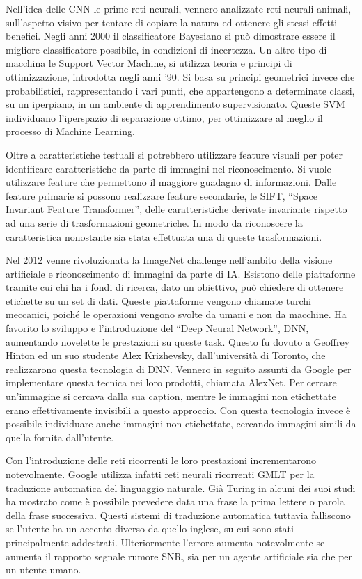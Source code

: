 \documentclass{article}
\numberwithin{equation}{subsection}
\begin{document}
Nell'idea delle CNN le prime reti neurali, vennero analizzate reti neurali animali, sull'aspetto visivo per tentare di copiare la natura ed ottenere gli stessi effetti 
benefici. 
Negli anni 2000 il classificatore Bayesiano si può dimostrare essere il migliore classificatore possibile, in condizioni di incertezza. Un altro tipo di macchina 
le Support Vector Machine, si utilizza teoria e principi di ottimizzazione, introdotta negli anni '90. Si basa su principi geometrici invece che probabilistici, 
rappresentando i vari punti, che appartengono a determinate classi,  su un iperpiano, in un ambiente di apprendimento supervisionato. Queste SVM individuano l'iperspazio 
di separazione ottimo, per ottimizzare al meglio il processo di Machine Learning. 

Oltre a caratteristiche testuali si potrebbero utilizzare feature visuali per poter identificare caratteristiche da parte di immagini nel riconoscimento. Si vuole 
utilizzare feature che permettono il maggiore guadagno di informazioni. Dalle feature primarie si possono realizzare feature secondarie, le SIFT, ``Space Invariant Feature Transformer'', 
delle caratteristiche derivate invariante rispetto ad una serie di trasformazioni geometriche. In modo da riconoscere la caratteristica nonostante sia stata effettuata 
una di queste trasformazioni. 

Nel 2012 venne rivoluzionata la ImageNet challenge nell'ambito della visione artificiale e riconoscimento di immagini da parte di IA. Esistono delle piattaforme tramite 
cui chi ha i fondi di ricerca, dato un obiettivo, può chiedere di ottenere etichette su un set di dati. Queste piattaforme vengono chiamate turchi meccanici, poiché 
le operazioni vengono svolte da umani e non da macchine. Ha favorito lo sviluppo e l'introduzione del ``Deep Neural Network'', DNN, aumentando novelette 
le prestazioni su queste task. 
Questo fu dovuto a Geoffrey Hinton ed un suo studente Alex Krizhevsky, dall'università di Toronto, che realizzarono questa tecnologia di DNN. Vennero in seguito 
assunti da Google per implementare questa tecnica nei loro prodotti, chiamata AlexNet. 
Per cercare un'immagine si cercava dalla sua caption, mentre le immagini non etichettate erano effettivamente invisibili a questo approccio. Con questa tecnologia 
invece è possibile individuare anche immagini non etichettate, cercando immagini simili da quella fornita dall'utente. 

Con l'introduzione delle reti ricorrenti le loro prestazioni incrementarono notevolmente. Google utilizza infatti reti neurali ricorrenti GMLT per la traduzione 
automatica del linguaggio naturale. Già Turing in alcuni dei suoi studi ha mostrato come è possibile prevedere data una frase la prima lettere o parola della frase 
successiva. 
Questi sistemi di traduzione automatica tuttavia falliscono se l'utente ha un accento diverso da quello inglese, su cui sono stati principalmente addestrati. 
Ulteriormente l'errore aumenta notevolmente se aumenta il rapporto segnale rumore SNR, sia per un agente artificiale sia che per un utente umano. 
\end{document}
